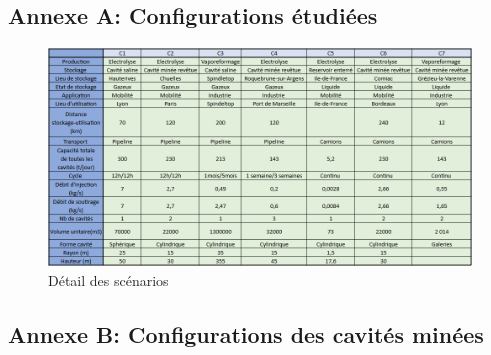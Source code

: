 \documentclass[11pt,french,a4paper]{article}
\begin{document}
\subsection*{Annexe A: Configurations étudiées} 

\begin{figure}[h]
\centering
\includegraphics[width=0.9\linewidth]{image/annexe/config_cavite_minee/configs.png}
\caption{Détail des scénarios}
\end{figure}

\FloatBarrier
\subsection*{Annexe B: Configurations des cavités minées} 
\end{document}
